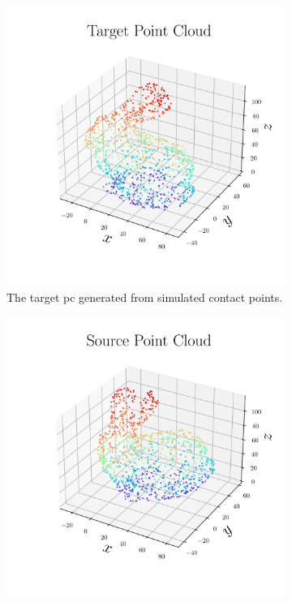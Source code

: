 \begin{figure}[!h]
	\centering
	\begin{subfigure}[b]{0.48\textwidth}
		\centering
		\includegraphics[width=\textwidth]{chapters/2-pose-estimation/fig/synthetic_pc_target.png}
		\caption{The target \gls{pc} generated from simulated contact points.\newline}
		\label{fig:pe-feature-filtered-pc}
	\end{subfigure}
	\begin{subfigure}[b]{0.48\textwidth}
		\centering
		\includegraphics[width=\textwidth]{chapters/2-pose-estimation/fig/synthetic_pc_source.png}

\end{subfigure}
\end{figure}
